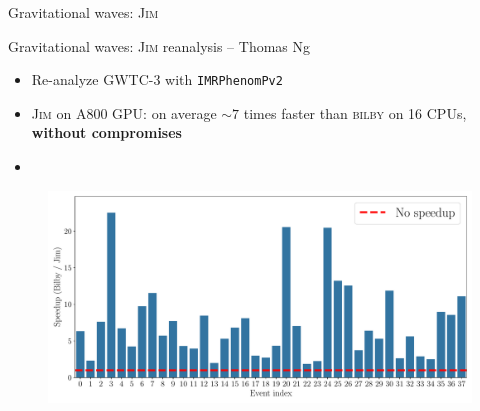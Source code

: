 \documentclass[usenames,dvipsnames,t]{beamer}
\begin{document}
\begin{frame}{Gravitational waves: \textsc{Jim}}

\end{frame}

\begin{frame}{Gravitational waves: \textsc{Jim} reanalysis -- Thomas Ng}

  \begin{itemize}
    \item Re-analyze GWTC-3 with \texttt{IMRPhenomPv2}

    \item \textsc{Jim} on A800 GPU: on average $\sim 7$ times faster than \textsc{bilby} on 16 CPUs, \textbf{without compromises}
    
    \item {}
  \end{itemize}

  \vspace{2mm}

  \begin{figure}
    \centering
    \includegraphics[width=0.90\linewidth]{Figures/speedup_NVIDIA_A800-SXM4-80GB.pdf}
  \end{figure}
  
\end{frame}
\end{document}
